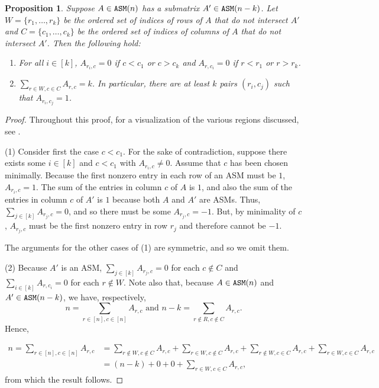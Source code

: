 \documentclass[12 pt]{amsart}
\DeclareMathOperator{\ASM}{{\tt ASM}}
\DeclareMathOperator{\asm}{\tt ASM}
\theoremstyle{plain}
\newtheorem{prop}[thm]{Proposition}
\theoremstyle{definition}
\theoremstyle{remark}
\begin{document}
{\begin{prop}
\label{containment-restrictions}
Suppose $A \in \ASM(n)$ has a submatrix $A' \in \ASM(n-k)$.  Let $W = \{r_1,\dots, r_k\}$ be the ordered set of indices of rows of $A$ that do not intersect $A'$ and $C = \{c_1, \dots, c_k\}$ be the ordered set of indices of columns of $A$ that do not intersect $A'$. Then the following hold:

\begin{enumerate}
    \item For all $i \in [k]$, $A_{r_i, c}=0$ if $c < c_1$ or $c>c_k$ and $A_{r,c_i}=0$ if $r < r_1$ or $r > r_k$.
    \item $\sum_{r \in W, c \in C} A_{r,c} = k$. In particular, there are at least $k$ pairs $(r_i,c_j)$ such that $A_{r_i,c_j} = 1$.
\end{enumerate}
\end{prop}
\begin{proof}
Throughout this proof, for a visualization of the various regions discussed, see .

(1) Consider first the case $c < c_1$. For the sake of contradiction, suppose there exists some $i \in [k]$ and $c<c_1$ with $A_{r_i,c} \neq 0$.  Assume that $c$ has been chosen minimally. Because the first nonzero entry in each row of an ASM must be $1$, $A_{r_i,c} = 1$. The sum of the entries in column $c$ of $A$ is $1$, and also the sum of the entries in column $c$ of $A'$ is $1$ because both $A$ and $A'$ are ASMs. Thus, $\sum_{j \in [k]} A_{r_j, c} = 0$, and so there must be some $A_{r_j,c} = -1$.  But, by minimality of $c$, $A_{r_j,c}$ must be the first nonzero entry in row $r_j$ and therefore cannot be $-1$.

The arguments for the other cases of (1) are symmetric, and so we omit them.

(2) Because $A'$ is an ASM, $\sum_{j \in [k]} A_{r_j,c} = 0$ for each $c \notin C$ and $\sum_{i \in [k]} A_{r,c_i} = 0$ for each $r \notin W$. Note also that, because $A \in \asm(n)$ and $A' \in \asm(n-k)$, we have, respectively, \[
n = \sum_{r \in [n], c \in [n] } A_{r,c} \mbox{ and } n-k = \sum_{r \notin R, c \notin C } A_{r,c}.
\]  Hence,

\begin{align*}
n = \sum_{{r \in [n], c \in [n] }} A_{r,c} &= \sum_{r \notin W, c \notin C } A_{r,c} + \sum_{r \in W, c \notin C } A_{r,c} + \sum_{ r \notin W, c \in C } A_{r,c} + \sum_{r \in W, c \in C } A_{r,c}\\
 &= (n-k)+0+0+\sum_{r \in W, c \in C } A_{r,c},
\end{align*} from which the result follows.
\end{proof}

}
\end{document}
